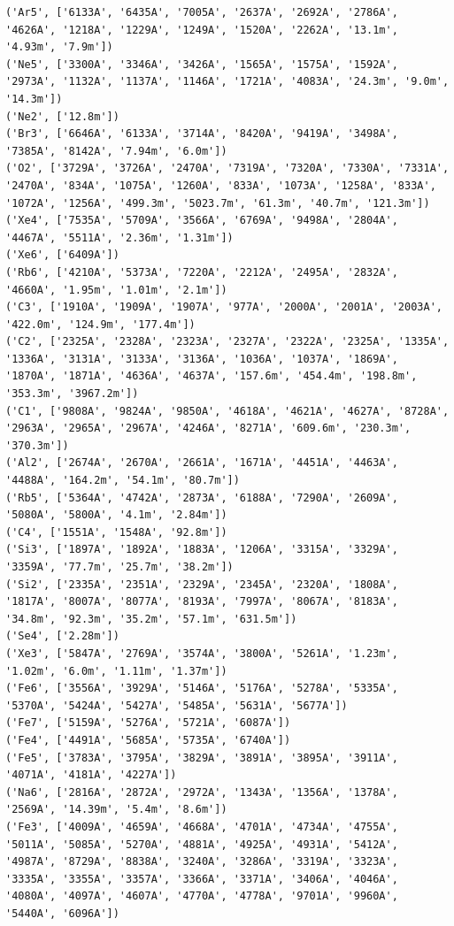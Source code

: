 \documentclass{report}
\begin{document}
\begin{Verbatim}[commandchars=\\\{\}]
('Ar5', ['6133A', '6435A', '7005A', '2637A', '2692A', '2786A', '4626A', '1218A', '1229A', '1249A', '1520A', '2262A', '13.1m', '4.93m', '7.9m'])
('Ne5', ['3300A', '3346A', '3426A', '1565A', '1575A', '1592A', '2973A', '1132A', '1137A', '1146A', '1721A', '4083A', '24.3m', '9.0m', '14.3m'])
('Ne2', ['12.8m'])
('Br3', ['6646A', '6133A', '3714A', '8420A', '9419A', '3498A', '7385A', '8142A', '7.94m', '6.0m'])
('O2', ['3729A', '3726A', '2470A', '7319A', '7320A', '7330A', '7331A', '2470A', '834A', '1075A', '1260A', '833A', '1073A', '1258A', '833A', '1072A', '1256A', '499.3m', '5023.7m', '61.3m', '40.7m', '121.3m'])
('Xe4', ['7535A', '5709A', '3566A', '6769A', '9498A', '2804A', '4467A', '5511A', '2.36m', '1.31m'])
('Xe6', ['6409A'])
('Rb6', ['4210A', '5373A', '7220A', '2212A', '2495A', '2832A', '4660A', '1.95m', '1.01m', '2.1m'])
('C3', ['1910A', '1909A', '1907A', '977A', '2000A', '2001A', '2003A', '422.0m', '124.9m', '177.4m'])
('C2', ['2325A', '2328A', '2323A', '2327A', '2322A', '2325A', '1335A', '1336A', '3131A', '3133A', '3136A', '1036A', '1037A', '1869A', '1870A', '1871A', '4636A', '4637A', '157.6m', '454.4m', '198.8m', '353.3m', '3967.2m'])
('C1', ['9808A', '9824A', '9850A', '4618A', '4621A', '4627A', '8728A', '2963A', '2965A', '2967A', '4246A', '8271A', '609.6m', '230.3m', '370.3m'])
('Al2', ['2674A', '2670A', '2661A', '1671A', '4451A', '4463A', '4488A', '164.2m', '54.1m', '80.7m'])
('Rb5', ['5364A', '4742A', '2873A', '6188A', '7290A', '2609A', '5080A', '5800A', '4.1m', '2.84m'])
('C4', ['1551A', '1548A', '92.8m'])
('Si3', ['1897A', '1892A', '1883A', '1206A', '3315A', '3329A', '3359A', '77.7m', '25.7m', '38.2m'])
('Si2', ['2335A', '2351A', '2329A', '2345A', '2320A', '1808A', '1817A', '8007A', '8077A', '8193A', '7997A', '8067A', '8183A', '34.8m', '92.3m', '35.2m', '57.1m', '631.5m'])
('Se4', ['2.28m'])
('Xe3', ['5847A', '2769A', '3574A', '3800A', '5261A', '1.23m', '1.02m', '6.0m', '1.11m', '1.37m'])
('Fe6', ['3556A', '3929A', '5146A', '5176A', '5278A', '5335A', '5370A', '5424A', '5427A', '5485A', '5631A', '5677A'])
('Fe7', ['5159A', '5276A', '5721A', '6087A'])
('Fe4', ['4491A', '5685A', '5735A', '6740A'])
('Fe5', ['3783A', '3795A', '3829A', '3891A', '3895A', '3911A', '4071A', '4181A', '4227A'])
('Na6', ['2816A', '2872A', '2972A', '1343A', '1356A', '1378A', '2569A', '14.39m', '5.4m', '8.6m'])
('Fe3', ['4009A', '4659A', '4668A', '4701A', '4734A', '4755A', '5011A', '5085A', '5270A', '4881A', '4925A', '4931A', '5412A', '4987A', '8729A', '8838A', '3240A', '3286A', '3319A', '3323A', '3335A', '3355A', '3357A', '3366A', '3371A', '3406A', '4046A', '4080A', '4097A', '4607A', '4770A', '4778A', '9701A', '9960A', '5440A', '6096A'])

\end{Verbatim}
\end{document}
